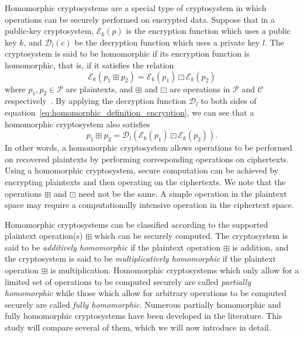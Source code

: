 Homomorphic cryptosystems are a special type of cryptosystem in which operations can be securely performed on encrypted data. Suppose that in a public-key cryptosystem, $\mathcal{E}_k \left(p \right)$ is the encryption function which uses a public key $k$, and $\mathcal{D}_l \left(c \right)$ be the decryption function which uses a private key $l$. The cryptosystem is said to be homomorphic if its encryption function is homomorphic, that is, if it satisfies the relation
\begin{equation}
    \label{eq:homomorphic_definition_encryption}
    \mathcal{E}_k \left(p_1 \boxplus p_2\right) = \mathcal{E}_k \left(p_1\right) \boxdot \mathcal{E}_k \left(p_2\right)
\end{equation}
where $p_1, p_2 \in \mathcal{P}$ are plaintexts, and $\boxplus$ and $\boxdot$ are operations in $\mathcal{P}$ and $\mathcal{C}$ respectively~\cite{fontaine_survey_2007}. By applying the decryption function $\mathcal{D}_l$ to both sides of equation~\ref{eq:homomorphic_definition_encryption}, we can see that a homomorphic cryptosystem also satisfies~\cite{li_elliptic_2012}
\begin{equation}
    \label{eq:homomorphic_definition_decryption}
    p_1 \boxplus p_2 = \mathcal{D}_l \left( \mathcal{E}_k \left(p_1\right) \boxdot \mathcal{E}_k \left(p_2\right) \right).
\end{equation}
In other words, a homomorphic cryptosystem allows operations to be performed on recovered plaintexts by performing corresponding operations on ciphertexts. Using a homomorphic cryptosystem, secure computation can be achieved by encrypting plaintexts and then operating on the ciphertexts. We note that the operations $\boxplus$ and $\boxdot$ need not be the same. A simple operation in the plaintext space may require a computationally intensive operation in the ciphertext space.

Homomorphic cryptosystems can be classified according to the supported plaintext operation(s) $\boxplus$ which can be securely computed. The cryptosystem is said to be \textit{additively homomorphic} if the plaintext operation $\boxplus$ is addition, and the cryptosystem is said to be \textit{multiplicatively homomorphic} if the plaintext operation $\boxplus$ is multiplication. Homomorphic cryptosystems which only allow for a limited set of operations to be computed securely are called \textit{partially homomorphic} while those which allow for arbitrary operations to be computed securely are called \textit{fully homomorphic}. Numerous partially homomorphic and fully homomorphic cryptosystems have been developed in the literature. This study will compare several of them, which we will now introduce in detail. 



